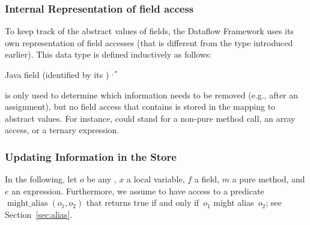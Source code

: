\subsubsection{Internal Representation of field access}
\label{sec:field-access}

To keep track of the abstract values of fields, the Dataflow Framework
uses its own representation of field accesses (that is different from
the  type introduced earlier).  This data type is defined
inductively as follows:

\begin{bnfgrammar}
        {  \qquad Java field (identified by its )}
        { \qquad {}}
        {  
            \literal{(} $^{,*}$ \literal{)}}
\end{bnfgrammar}

 is only used to determine which
information needs to be removed (e.g., after an assignment), but no field
access that contains  is stored in the mapping to
abstract values.  For instance,  could stand for
a non-pure method call, an array access, or a ternary expression.


\subsubsection{Updating Information in the Store}

\newcommand{\alias}{\operatorname{might\_alias}}

In the following, let $o$ be any , $x$ a local
variable, $f$ a field, $m$ a pure method, and $e$ an expression.
Furthermore, we assume to have access to a predicate $\alias(o_1,o_2)$
that returns true if and only if~$o_1$ might alias~$o_2$; see
Section~\ref{sec:alias}.


